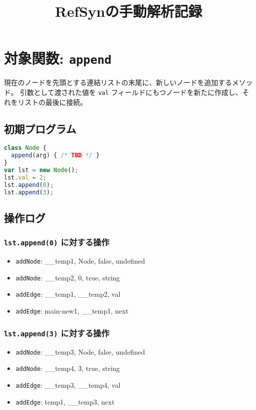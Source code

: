 \documentclass{article}
\title{RefSynの手動解析記録}
\author{}
\date{}
\begin{document}
\maketitle

\section{対象関数: \texttt{append}}
現在のノードを先頭とする連結リストの末尾に、新しいノードを追加するメソッド。
引数として渡された値を \texttt{val} フィールドにもつノードを新たに作成し、それをリストの最後に接続。

\subsection{初期プログラム}

\begin{lstlisting}[language=JavaScript]
class Node {
  append(arg) { /* TBD */ }
}
var lst = new Node(); 
lst.val = 2;
lst.append(0);
lst.append(3);
\end{lstlisting}

\subsection{操作ログ}

\subsubsection{\texttt{lst.append(0)} に対する操作}
\begin{itemize}
  \item \texttt{addNode}: \_\_temp1, Node, false, undefined
  \item \texttt{addNode}: \_\_temp2, 0, true, string
  \item \texttt{addEdge}: \_\_temp1, \_\_temp2, val
  \item \texttt{addEdge}: main-new1, \_\_temp1, next
\end{itemize}

\subsubsection{\texttt{lst.append(3)} に対する操作}
\begin{itemize}
  \item \texttt{addNode}: \_\_temp3, Node, false, undefined
  \item \texttt{addNode}: \_\_temp4, 3, true, string
  \item \texttt{addEdge}: \_\_temp3, \_\_temp4, val
  \item \texttt{addEdge}: temp1, \_\_temp3, next
\end{itemize}
\end{document}
